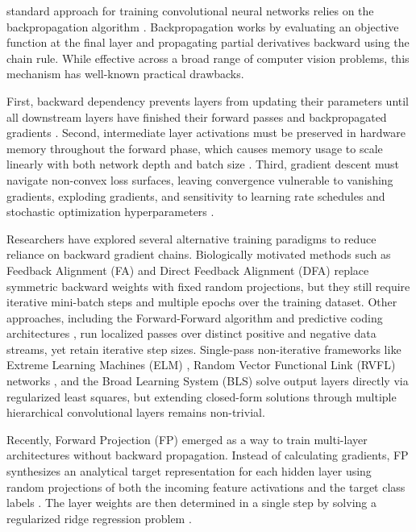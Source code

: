 \documentclass[journal]{IEEEtran}
\begin{document}
 standard approach for training convolutional neural networks relies on the backpropagation algorithm \cite{rumelhart1986learning}. Backpropagation works by evaluating an objective function at the final layer and propagating partial derivatives backward using the chain rule. While effective across a broad range of computer vision problems, this mechanism has well-known practical drawbacks. 

First, backward dependency prevents layers from updating their parameters until all downstream layers have finished their forward passes and backpropagated gradients \cite{jaderberg2017decoupled}. Second, intermediate layer activations must be preserved in hardware memory throughout the forward phase, which causes memory usage to scale linearly with both network depth and batch size \cite{chen2016training, gomez2017reversible}. Third, gradient descent must navigate non-convex loss surfaces, leaving convergence vulnerable to vanishing gradients, exploding gradients, and sensitivity to learning rate schedules and stochastic optimization hyperparameters \cite{lecun2015deep, goodfellow2016deep}.

Researchers have explored several alternative training paradigms to reduce reliance on backward gradient chains. Biologically motivated methods such as Feedback Alignment (FA) \cite{lillicrap2016random} and Direct Feedback Alignment (DFA) \cite{nokland2016direct, crafton2019direct} replace symmetric backward weights with fixed random projections, but they still require iterative mini-batch steps and multiple epochs over the training dataset. Other approaches, including the Forward-Forward algorithm \cite{hinton2022forward} and predictive coding architectures \cite{rao1999predictive, whittington2017approximation}, run localized passes over distinct positive and negative data streams, yet retain iterative step sizes. Single-pass non-iterative frameworks like Extreme Learning Machines (ELM) \cite{huang2006extreme, huang2011extreme}, Random Vector Functional Link (RVFL) networks \cite{pao1994functional, igelnik1995stochastic, zhang2016comprehensive}, and the Broad Learning System (BLS) \cite{chen2017broad, liu2021broad} solve output layers directly via regularized least squares, but extending closed-form solutions through multiple hierarchical convolutional layers remains non-trivial.

Recently, Forward Projection (FP) emerged as a way to train multi-layer architectures without backward propagation. Instead of calculating gradients, FP synthesizes an analytical target representation for each hidden layer using random projections of both the incoming feature activations and the target class labels \cite{bingham2001random, vempala2005random}. The layer weights are then determined in a single step by solving a regularized ridge regression problem \cite{hoerl1970ridge}.
\end{document}
